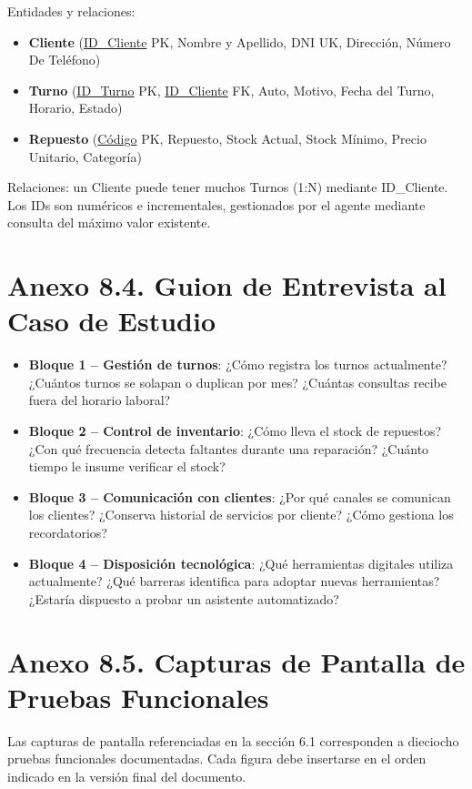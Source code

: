 \documentclass[12pt,a4paper]{report}
\begin{document}
Entidades y relaciones:

\begin{itemize}
  \item \textbf{Cliente} (\underline{ID\_Cliente} PK, Nombre y Apellido, DNI UK, Dirección, Número De Teléfono)
  \item \textbf{Turno} (\underline{ID\_Turno} PK, \underline{ID\_Cliente} FK, Auto, Motivo, Fecha del Turno, Horario, Estado)
  \item \textbf{Repuesto} (\underline{Código} PK, Repuesto, Stock Actual, Stock Mínimo, Precio Unitario, Categoría)
\end{itemize}

Relaciones: un Cliente puede tener muchos Turnos (1:N) mediante ID\_Cliente. Los IDs son numéricos e incrementales, gestionados por el agente mediante consulta del máximo valor existente.

\section*{Anexo 8.4. Guion de Entrevista al Caso de Estudio}
\label{anexo:entrevista}

\begin{itemize}
  \item \textbf{Bloque 1 -- Gestión de turnos}: ¿Cómo registra los turnos actualmente? ¿Cuántos turnos se solapan o duplican por mes? ¿Cuántas consultas recibe fuera del horario laboral?
  \item \textbf{Bloque 2 -- Control de inventario}: ¿Cómo lleva el stock de repuestos? ¿Con qué frecuencia detecta faltantes durante una reparación? ¿Cuánto tiempo le insume verificar el stock?
  \item \textbf{Bloque 3 -- Comunicación con clientes}: ¿Por qué canales se comunican los clientes? ¿Conserva historial de servicios por cliente? ¿Cómo gestiona los recordatorios?
  \item \textbf{Bloque 4 -- Disposición tecnológica}: ¿Qué herramientas digitales utiliza actualmente? ¿Qué barreras identifica para adoptar nuevas herramientas? ¿Estaría dispuesto a probar un asistente automatizado?
\end{itemize}

\section*{Anexo 8.5. Capturas de Pantalla de Pruebas Funcionales}

Las capturas de pantalla referenciadas en la sección 6.1 corresponden a dieciocho pruebas funcionales documentadas. Cada figura debe insertarse en el orden indicado en la versión final del documento.
\end{document}

